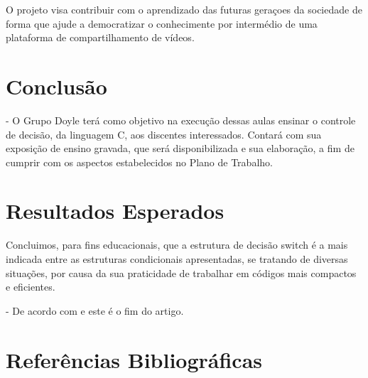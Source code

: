 \documentclass[a4paper,12pt]{article}  %
\begin{document}
   O projeto visa contribuir com o aprendizado das futuras geraçoes da sociedade de forma que ajude a democratizar o conhecimente por intermédio de uma plataforma de compartilhamento de vídeos.



\section{Conclusão}

   -  O Grupo Doyle terá como objetivo na execução dessas aulas ensinar o controle de decisão, da linguagem C, aos discentes interessados.
 Contará com sua exposição de ensino gravada, que será disponibilizada e sua elaboração, a fim de cumprir com os aspectos estabelecidos no Plano de Trabalho.





\section{Resultados Esperados}



   Concluimos, para fins educacionais, que a estrutura de decisão switch é a mais indicada entre as estruturas condicionais apresentadas, se tratando de diversas situações,  por causa da sua praticidade de trabalhar em códigos mais compactos e eficientes. \newline


   - De acordo com \cite{benante2008phd} e este é o fim do artigo.


\section{Referências Bibliográficas}
\end{document}
